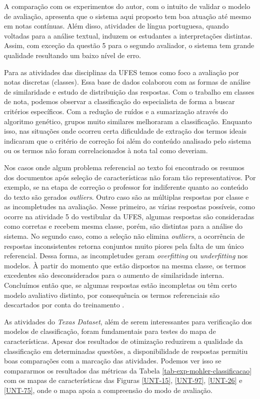 A comparação com os experimentos do autor, com o intuito de validar o modelo de avaliação, apresenta que o sistema aqui proposto tem boa atuação até mesmo em notas contínuas. Além disso, atividades de língua portuguesa, quando voltadas para a análise textual, induzem os estudantes a interpretações distintas. Assim, com exceção  da questão 5 para o segundo avaliador, o sistema tem grande qualidade resultando um baixo nível de erro.

Para as atividades das disciplinas da UFES temos como foco a avaliação por notas discretas (classes). Essa base de dados colaborou com as formas de análise de similaridade e estudo de distribuição das respostas. Com o trabalho em classes de nota, podemos observar a classificação do especialista de forma a buscar critérios específicos. Com a redução de ruídos e a sumarização através do algoritmo genético, grupos muito similares melhoraram a classificação. Enquanto isso, nas situações onde ocorreu certa dificuldade de extração dos termos ideais indicaram que o critério de correção foi além do conteúdo analisado pelo sistema ou os termos não foram correlacionados à nota tal como deveriam.

Nos casos onde algum problema referencial ao texto foi encontrado os resumos dos documentos após seleção de características não foram tão representativos. Por exemplo, se na etapa de correção o professor for indiferente quanto ao conteúdo do texto são gerados \textit{outliers}. Outro caso são as múltiplas respostas por classe e as incompletudes na avaliação. Nesse primeiro, as várias respostas possíveis, como ocorre na atividade 5 do vestibular da UFES, algumas respostas são consideradas como corretas e recebem mesma classe, porém, são distintas para a análise do sistema. No segundo caso, como a seleção não elimina \textit{outliers}, a ocorrência de respostas inconsistentes retorna conjuntos muito piores pela falta de um único referencial. Dessa forma, as incompletudes geram \textit{overfitting} ou \textit{underfitting} nos modelos. À partir do momento que estão dispostos na mesma classe, os termos excedentes são desconsiderados para o aumento de similaridade interna. Concluímos então que, se algumas respostas estão incompletas ou têm certo modelo avaliativo distinto, por consequência os termos referenciais são descartados por conta do treinamento \cite{spalenza2016SBIE}.

As atividades do \textit{Texas Dataset}, além de serem interessantes para verificação dos modelos de classificação, foram fundamentais para testes do mapa de características. Apesar dos resultados de otimização reduzirem a qualidade da classificação em determinadas questões, a disponibilidade de respostas permitiu boas comparações com a marcação das atividades. Podemos ver isso se compararmos os resultados das métricas da Tabela \ref{tab-exp-mohler-classificacao} com os mapas de características das Figuras \ref{UNT-15}, \ref{UNT-97}, \ref{UNT-26} e \ref{UNT-75}, onde o mapa apoia a compreensão do modo de avaliação. 

